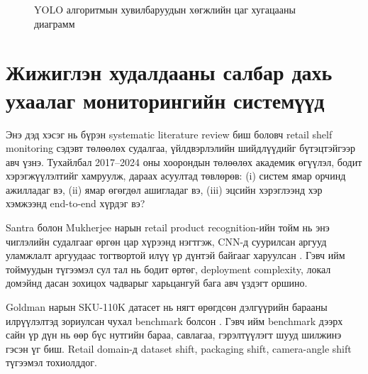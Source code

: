 \begin{figure}[H]
\centering
{}
\caption{YOLO алгоритмын хувилбаруудын хөгжлийн цаг хугацааны диаграмм}
\label{fig:yolo_timeline}
\end{figure}

\section{Жижиглэн худалдааны салбар дахь ухаалаг мониторингийн системүүд}
Энэ дэд хэсэг нь бүрэн systematic literature review биш боловч retail shelf monitoring сэдэвт төлөөлөх судалгаа, үйлдвэрлэлийн шийдлүүдийг бүтэцтэйгээр авч үзнэ. Тухайлбал 2017--2024 оны хоорондын төлөөлөх академик өгүүлэл, бодит хэрэгжүүлэлтийг хамруулж, дараах асуултад төвлөрөв: (i) систем ямар орчинд ажилладаг вэ, (ii) ямар өгөгдөл ашигладаг вэ, (iii) эцсийн хэрэглээнд хэр хэмжээнд end-to-end хүрдэг вэ?

Santra болон Mukherjee нарын retail product recognition-ийн тойм нь энэ чиглэлийн судалгааг өргөн цар хүрээнд нэгтгэж, CNN-д суурилсан аргууд уламжлалт аргуудаас тогтвортой илүү үр дүнтэй байгааг харуулсан \cite{retail_cv_survey}. Гэвч ийм тоймуудын түгээмэл сул тал нь бодит өртөг, deployment complexity, локал домэйнд дасан зохицох чадварыг харьцангуй бага авч үздэгт оршино.

Goldman нарын SKU-110K датасет нь нягт өрөгдсөн дэлгүүрийн барааны илрүүлэлтэд зориулсан чухал benchmark болсон \cite{sku110k}. Гэвч ийм benchmark дээрх сайн үр дүн нь өөр бүс нутгийн бараа, савлагаа, гэрэлтүүлэгт шууд шилжинэ гэсэн үг биш. Retail domain-д dataset shift, packaging shift, camera-angle shift түгээмэл тохиолддог.

